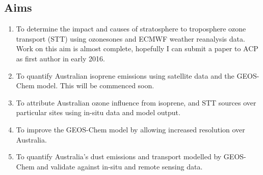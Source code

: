 
\subsection{Aims}
\begin{enumerate}
\item To determine the impact and causes of stratosphere to troposphere ozone transport (STT) using ozonesones and ECMWF weather reanalysis data. Work on this aim is almost complete, hopefully I can submit a paper to ACP as first author in early 2016.
\item To quantify Australian isoprene emissions using satellite data and the GEOS-Chem model. This will be commenced soon.
\item To attribute Australian ozone influence from isoprene, and STT sources over particular sites using in-situ data and model output.
\item To improve the GEOS-Chem model by allowing increased resolution over Australia.
\item To quantify Australia's dust emissions and transport modelled by GEOS-Chem and validate against in-situ and remote sensing data.
\end{enumerate}